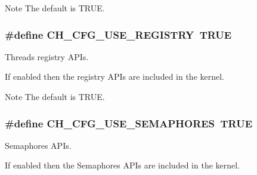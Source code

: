 \begin{DoxyNote}{Note}
The default is {\ttfamily T\+R\+U\+E}. 
\end{DoxyNote}
\hypertarget{group__config_gaefe648290026609c1a1ee2d687ff60c1}{
\subsubsection[{C\+H\+\_\+\+C\+F\+G\+\_\+\+U\+S\+E\+\_\+\+R\+E\+G\+I\+S\+T\+R\+Y}]{\setlength{\rightskip}{0pt plus 5cm}\#define C\+H\+\_\+\+C\+F\+G\+\_\+\+U\+S\+E\+\_\+\+R\+E\+G\+I\+S\+T\+R\+Y~T\+R\+U\+E}}\label{group__config_gaefe648290026609c1a1ee2d687ff60c1}


Threads registry A\+P\+Is. 

If enabled then the registry A\+P\+Is are included in the kernel.

\begin{DoxyNote}{Note}
The default is {\ttfamily T\+R\+U\+E}. 
\end{DoxyNote}
\hypertarget{group__config_gae66a111a6efc858624b42c8370b62cf6}{
\subsubsection[{C\+H\+\_\+\+C\+F\+G\+\_\+\+U\+S\+E\+\_\+\+S\+E\+M\+A\+P\+H\+O\+R\+E\+S}]{\setlength{\rightskip}{0pt plus 5cm}\#define C\+H\+\_\+\+C\+F\+G\+\_\+\+U\+S\+E\+\_\+\+S\+E\+M\+A\+P\+H\+O\+R\+E\+S~T\+R\+U\+E}}\label{group__config_gae66a111a6efc858624b42c8370b62cf6}


Semaphores A\+P\+Is. 

If enabled then the Semaphores A\+P\+Is are included in the kernel.

